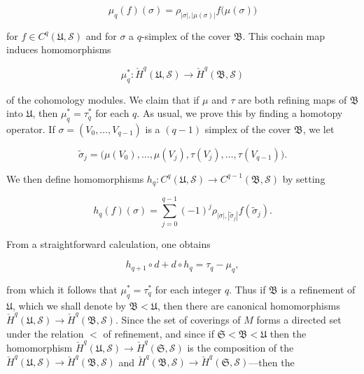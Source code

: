 \begin{equation}
\tag{7}\label{eq:5.33:7}
\mu_{q}(f)(\sigma)=\rho_{|\sigma|,|\mu(\sigma)|}f\big(\mu(\sigma)\big)
\end{equation}

for $f\in C^{q}(\mathfrak{U},\mathcal{S})$ and for $\sigma$ a $q$-simplex of the cover $\mathfrak{B}$. This cochain map induces homomorphisms

\begin{equation}
\tag{8}\label{eq:5.33:8}
\mu_{q}^{*}\colon\check{H}^{q}(\mathfrak{U},\mathcal{S})\to\check{H}^{q}(\mathfrak{B},\mathcal{S})
\end{equation}

of the cohomology modules. We claim that if $\mu$ and $\tau$ are both refining maps of $\mathfrak{B}$ into $\mathfrak{U}$, then $\mu_{q}^{*}=\tau_{q}^{*}$ for each $q$. As usual, we prove this by finding a homotopy operator. If $\sigma=(V_{0},\ldots,V_{q-1})$ is a $(q-1)$ simplex of the cover $\mathfrak{B}$, we let

\begin{equation}
\tag{9}\label{eq:5.33:9}
\tilde{\sigma}_{j}=\big(\mu(V_{0}),\ldots,\mu(V_{j}),\tau(V_{j}),\ldots,\tau(V_{q-1})\big).
\end{equation}

We then define homomorphisms  $ h_{q}\colon C^{q}(\mathfrak{U},\mathcal{S})\to C^{q-1}(\mathfrak{B},\mathcal{S}) $ by setting

\begin{equation}
\tag{10}\label{eq:5.33:10}
h_{q}(f)(\sigma)=\sum_{j=0}^{q-1}(-1)^{j}\rho_{|\sigma|,|\widetilde{\sigma}_{j}|}f(\widetilde{\sigma}_{j}).
\end{equation}

From a straightforward calculation, one obtains

\begin{equation}
\tag{11}\label{eq:5.33:11}
h_{q+1}\circ d+d\circ h_{q}=\tau_{q}-\mu_{q},
\end{equation}

from which it follows that $\mu_{q}^{*}=\tau_{q}^{*}$ for each integer $q$. Thus if $\mathfrak{B}$ is a refinement of $\mathfrak{U}$, which we shall denote by $\mathfrak{B}<\mathfrak{U}$, then there are canonical homomorphisms $\check{H}^{q}(\mathfrak{U},\mathcal{S})\to\check{H}^{q}(\mathfrak{B},\mathcal{S})$. Since the set of coverings of $M$ forms a directed set under the relation $<$ of refinement, and since if $\mathfrak{S}<\mathfrak{B}<\mathfrak{U}$ then the homomorphism $\check{H}^{q}(\mathfrak{U},\mathcal{S})\to\check{H}^{q}(\mathfrak{S},\mathcal{S})$ is the composition of the $\check{H}^{q}(\mathfrak{U},\mathcal{S})\to\check{H}^{q}(\mathfrak{B},\mathcal{S})$ and $\check{H}^{q}(\mathfrak{B},\mathcal{S})\to\check{H}^{q}(\mathfrak{S},\mathcal{S})$—then the

